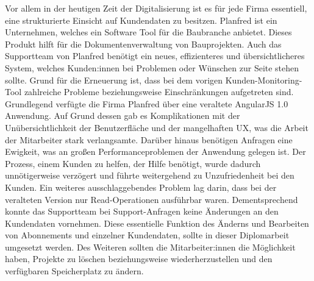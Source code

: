 Vor allem in der heutigen Zeit der Digitalisierung ist es f\"ur jede Firma essentiell, eine strukturierte Einsicht auf Kundendaten zu besitzen. Planfred ist ein Unternehmen, welches ein Software Tool für die Baubranche anbietet. Dieses Produkt hilft für die Dokumentenverwaltung von Bauprojekten. Auch das Supportteam von Planfred benötigt ein neues, effizienteres und \"ubersichtlicheres System, welches Kunden:innen bei Problemen oder W\"unschen zur Seite stehen sollte. Grund für die Erneuerung ist, dass bei dem vorigen Kunden-Monitoring-Tool zahlreiche Probleme beziehungsweise Einschränkungen aufgetreten sind.
\newline
Grundlegend verf\"ugte die Firma Planfred \"uber eine veraltete AngularJS 1.0 Anwendung. Auf Grund dessen gab es Komplikationen mit der Un\"ubersichtlichkeit der Benutzerfläche und der mangelhaften UX, was die Arbeit der Mitarbeiter stark verlangsamte. Dar\"uber hinaus benötigen Anfragen eine Ewigkeit, was an großen Performanceproblemen der Anwendung gelegen ist. Der Prozess, einem Kunden zu helfen, der Hilfe benötigt, wurde dadurch unnötigerweise verzögert und f\"uhrte weitergehend zu Unzufriedenheit bei den Kunden.
\newline
Ein weiteres ausschlaggebendes Problem lag darin, dass bei der veralteten Version nur Read-Operationen ausf\"uhrbar waren. Dementsprechend konnte das Supportteam bei Support-Anfragen keine Änderungen an den Kundendaten vornehmen. Diese essentielle Funktion des Änderns und Bearbeiten von Abonnements und einzelner Kundendaten, sollte in dieser Diplomarbeit umgesetzt werden. Des Weiteren sollten die Mitarbeiter:innen die Möglichkeit haben, Projekte zu löschen beziehungsweise wiederherzustellen und den verf\"ugbaren Speicherplatz zu ändern.